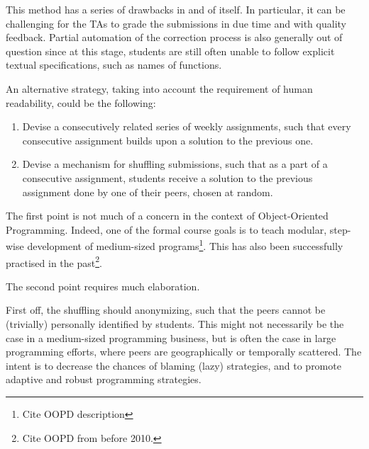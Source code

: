 This method has a series of drawbacks in and of itself. In particular, it can
be challenging for the TAs to grade the submissions in due time and with
quality feedback. Partial automation of the correction process is also
generally out of question since at this stage, students are still often unable
to follow explicit textual specifications, such as names of functions.

An alternative strategy, taking into account the requirement of human
readability, could be the following:

\begin{enumerate}

\item Devise a consecutively related series of weekly assignments, such
that every consecutive assignment builds upon a solution to the previous one.

\item Devise a mechanism for shuffling submissions, such that as a part of a
consecutive assignment, students receive a solution to the previous assignment
done by one of their peers, chosen at random.

\end{enumerate}

The first point is not much of a concern in the context of Object-Oriented
Programming.  Indeed, one of the formal course goals is to teach modular,
step-wise development of medium-sized programs\footnote{Cite OOPD description}.
This has also been successfully practised in the past\footnote{Cite OOPD from
before 2010.}.

The second point requires much elaboration.

First off, the shuffling should anonymizing, such that the peers cannot be
(trivially) personally identified by students. This might not necessarily be
the case in a medium-sized programming business, but is often the case in large
programming efforts, where peers are geographically or temporally scattered.
The intent is to decrease the chances of blaming (lazy) strategies, and to
promote adaptive and robust programming strategies.

